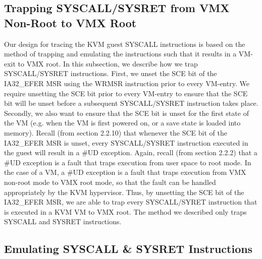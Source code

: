 \documentclass{report}
\begin{document}
\begin{spacing}{1.5}
\subsection{Trapping SYSCALL/SYSRET from VMX Non-Root to VMX Root}
{\large
Our design for tracing the KVM guest SYSCALL instructions is based on the method of trapping and emulating the instructions such that it results in a VM-exit to VMX root. In this subsection, we describe how we trap SYSCALL/SYSRET instructions. First, we unset the SCE bit of the IA32\_EFER MSR using the WRMSR instruction prior to every VM-entry. We require unsetting the SCE bit prior to every VM-entry to ensure that the SCE bit will be unset before a subsequent SYSCALL/SYSRET instruction takes place. Secondly, we also want to ensure that the SCE bit is unset for the first state of the VM (e.g. when the VM is first powered on, or a save state is loaded into memory). Recall (from section 2.2.10) that whenever the SCE bit of the IA32\_EFER MSR is unset, every SYSCALL/SYSRET instruction executed in the guest will result in a \#UD exception. Again, recall (from section 2.2.2) that a \#UD exception is a fault that traps execution from user space to root mode. In the case of a VM, a \#UD exception is a fault that traps execution from VMX non-root mode to VMX root mode, so that the fault can be handled appropriately by the KVM hypervisor. Thus, by unsetting the SCE bit of the IA32\_EFER MSR, we are able to trap every SYSCALL/SYRET instruction that is executed in a KVM VM to VMX root. The method we described only traps SYSCALL and SYSRET instructions.
\newline
}







\subsection{Emulating SYSCALL \& SYSRET Instructions}


\end{spacing}
\end{document}
